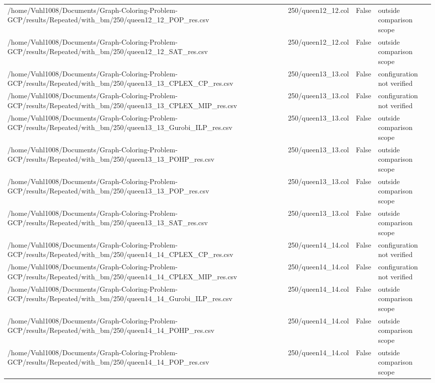\begin{table}[htbp]
\begin{tabular}{llll}
/home/Vuhl1008/Documents/Graph-Coloring-Problem-GCP/results/Repeated/with\_bm/250/queen12\_12\_POP\_res.csv & 250/queen12\_12.col & False & outside comparison scope \\
/home/Vuhl1008/Documents/Graph-Coloring-Problem-GCP/results/Repeated/with\_bm/250/queen12\_12\_SAT\_res.csv & 250/queen12\_12.col & False & outside comparison scope \\
/home/Vuhl1008/Documents/Graph-Coloring-Problem-GCP/results/Repeated/with\_bm/250/queen13\_13\_CPLEX\_CP\_res.csv & 250/queen13\_13.col & False & configuration not verified \\
/home/Vuhl1008/Documents/Graph-Coloring-Problem-GCP/results/Repeated/with\_bm/250/queen13\_13\_CPLEX\_MIP\_res.csv & 250/queen13\_13.col & False & configuration not verified \\
/home/Vuhl1008/Documents/Graph-Coloring-Problem-GCP/results/Repeated/with\_bm/250/queen13\_13\_Gurobi\_ILP\_res.csv & 250/queen13\_13.col & False & outside comparison scope \\
/home/Vuhl1008/Documents/Graph-Coloring-Problem-GCP/results/Repeated/with\_bm/250/queen13\_13\_POHP\_res.csv & 250/queen13\_13.col & False & outside comparison scope \\
/home/Vuhl1008/Documents/Graph-Coloring-Problem-GCP/results/Repeated/with\_bm/250/queen13\_13\_POP\_res.csv & 250/queen13\_13.col & False & outside comparison scope \\
/home/Vuhl1008/Documents/Graph-Coloring-Problem-GCP/results/Repeated/with\_bm/250/queen13\_13\_SAT\_res.csv & 250/queen13\_13.col & False & outside comparison scope \\
/home/Vuhl1008/Documents/Graph-Coloring-Problem-GCP/results/Repeated/with\_bm/250/queen14\_14\_CPLEX\_CP\_res.csv & 250/queen14\_14.col & False & configuration not verified \\
/home/Vuhl1008/Documents/Graph-Coloring-Problem-GCP/results/Repeated/with\_bm/250/queen14\_14\_CPLEX\_MIP\_res.csv & 250/queen14\_14.col & False & configuration not verified \\
/home/Vuhl1008/Documents/Graph-Coloring-Problem-GCP/results/Repeated/with\_bm/250/queen14\_14\_Gurobi\_ILP\_res.csv & 250/queen14\_14.col & False & outside comparison scope \\
/home/Vuhl1008/Documents/Graph-Coloring-Problem-GCP/results/Repeated/with\_bm/250/queen14\_14\_POHP\_res.csv & 250/queen14\_14.col & False & outside comparison scope \\
/home/Vuhl1008/Documents/Graph-Coloring-Problem-GCP/results/Repeated/with\_bm/250/queen14\_14\_POP\_res.csv & 250/queen14\_14.col & False & outside comparison scope \\

\end{tabular}
\end{table}

